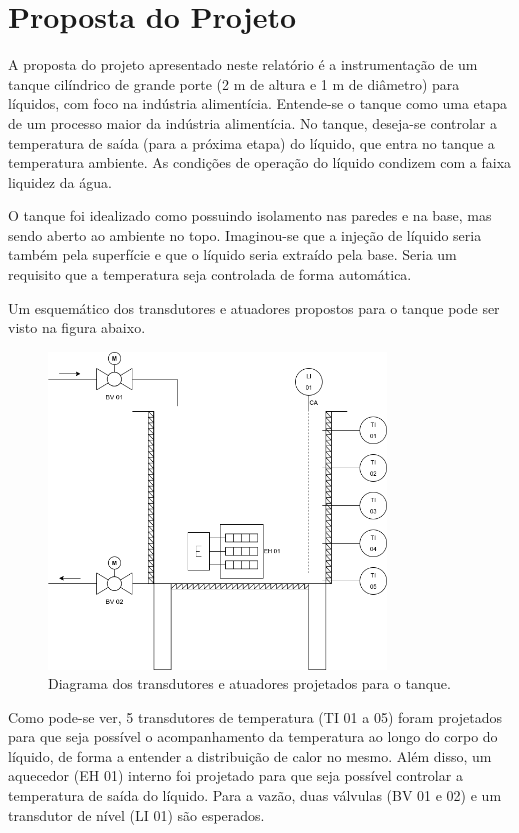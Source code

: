 \section{Proposta do Projeto}

A proposta do projeto apresentado neste relatório é a instrumentação de um tanque cilíndrico de grande porte (2 m de altura e 1 m de diâmetro) para líquidos, com foco na indústria alimentícia. Entende-se o tanque como uma etapa de um processo maior da indústria alimentícia. No tanque, deseja-se controlar a temperatura de saída (para a próxima etapa) do líquido, que entra no tanque a temperatura ambiente. As condições de operação do líquido condizem com a faixa liquidez da água.

O tanque foi idealizado como possuindo isolamento nas paredes e na base, mas sendo aberto ao ambiente no topo. Imaginou-se que a injeção de líquido seria também pela superfície e que o líquido seria extraído pela base. Seria um requisito que a temperatura seja controlada de forma automática.

Um esquemático dos transdutores e atuadores propostos para o tanque pode ser visto na figura abaixo.

\begin{figure}[H]
    \centering
    \includegraphics[width=0.8\textwidth]{imagens/tank.png}
    \caption{Diagrama dos transdutores e atuadores projetados para o tanque.}
    \label{fig:imagens-tank-png}
\end{figure}

Como pode-se ver, 5 transdutores de temperatura (TI 01 a 05) foram projetados para que seja possível o acompanhamento da temperatura ao longo do corpo do líquido, de forma a entender a distribuição de calor no mesmo. Além disso, um aquecedor (EH 01) interno foi projetado para que seja possível controlar a temperatura de saída do líquido. Para a vazão, duas válvulas (BV 01 e 02) e um transdutor de nível (LI 01) são esperados.

